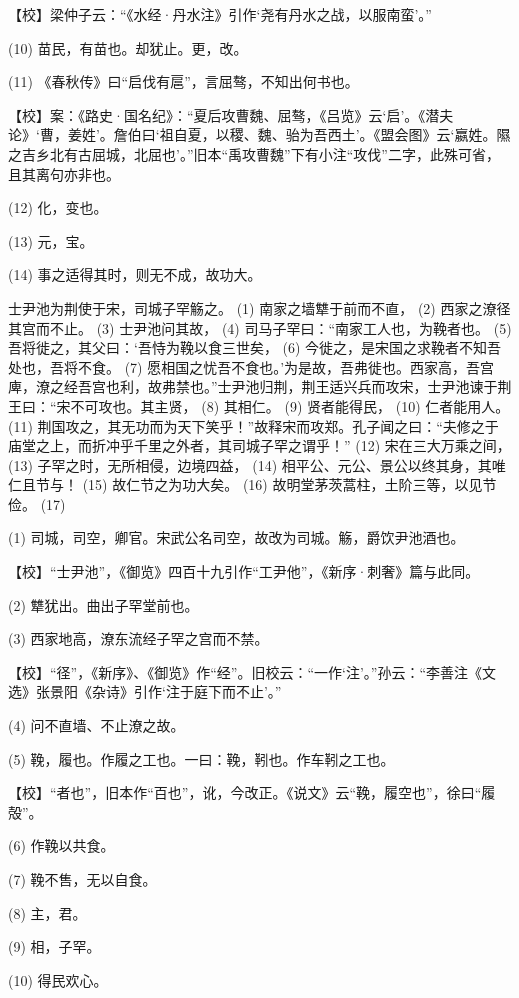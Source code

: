 \documentclass[12pt,UTF8]{ctexbook}
\begin{document}
【校】梁仲子云：“《水经·丹水注》引作‘尧有丹水之战，以服南蛮’。”

(10) 苗民，有苗也。却犹止。更，改。

(11) 《春秋传》曰“启伐有扈”，言屈骜，不知出何书也。

【校】案：《路史·国名纪》：“夏后攻曹魏、屈骜，《吕览》云‘启’。《潜夫论》‘曹，姜姓’。詹伯曰‘祖自夏，以稷、魏、骀为吾西土’。《盟会图》云‘嬴姓。隰之吉乡北有古屈城，北屈也’。”旧本“禹攻曹魏”下有小注“攻伐”二字，此殊可省，且其离句亦非也。

(12) 化，变也。

(13) 元，宝。

(14) 事之适得其时，则无不成，故功大。

士尹池为荆使于宋，司城子罕觞之。 (1) 南家之墙犨于前而不直， (2) 西家之潦径其宫而不止。 (3) 士尹池问其故， (4) 司马子罕曰：“南家工人也，为鞔者也。 (5) 吾将徙之，其父曰：‘吾恃为鞔以食三世矣， (6) 今徙之，是宋国之求鞔者不知吾处也，吾将不食。 (7) 愿相国之忧吾不食也。’为是故，吾弗徙也。西家高，吾宫庳，潦之经吾宫也利，故弗禁也。”士尹池归荆，荆王适兴兵而攻宋，士尹池谏于荆王曰：“宋不可攻也。其主贤， (8) 其相仁。 (9) 贤者能得民， (10) 仁者能用人。 (11) 荆国攻之，其无功而为天下笑乎！”故释宋而攻郑。孔子闻之曰：“夫修之于庙堂之上，而折冲乎千里之外者，其司城子罕之谓乎！” (12) 宋在三大万乘之间， (13) 子罕之时，无所相侵，边境四益， (14) 相平公、元公、景公以终其身，其唯仁且节与！ (15) 故仁节之为功大矣。 (16) 故明堂茅茨蒿柱，土阶三等，以见节俭。 (17)

(1) 司城，司空，卿官。宋武公名司空，故改为司城。觞，爵饮尹池酒也。

【校】“士尹池”，《御览》四百十九引作“工尹他”，《新序·刺奢》篇与此同。

(2) 犨犹出。曲出子罕堂前也。

(3) 西家地高，潦东流经子罕之宫而不禁。

【校】“径”，《新序》、《御览》作“经”。旧校云：“一作‘注’。”孙云：“李善注《文选》张景阳《杂诗》引作‘注于庭下而不止’。”

(4) 问不直墙、不止潦之故。

(5) 鞔，履也。作履之工也。一曰：鞔，靷也。作车靷之工也。

【校】“者也”，旧本作“百也”，讹，今改正。《说文》云“鞔，履空也”，徐曰“履殻”。

(6) 作鞔以共食。

(7) 鞔不售，无以自食。

(8) 主，君。

(9) 相，子罕。

(10) 得民欢心。
\end{document}
